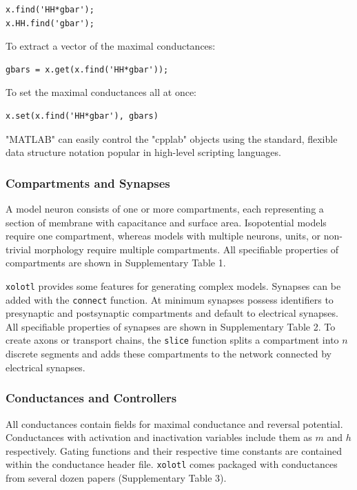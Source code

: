 \documentclass{frontiersSCNS} %
\begin{document}
\begin{lstlisting}[style=Matlab-editor]
x.find('HH*gbar');
x.HH.find('gbar');
\end{lstlisting}

To extract a vector of the maximal conductances:

\begin{lstlisting}[style=Matlab-editor]
gbars = x.get(x.find('HH*gbar'));
\end{lstlisting}

To set the maximal conductances all at once:

\begin{lstlisting}[style=Matlab-editor]
x.set(x.find('HH*gbar'), gbars)
\end{lstlisting}

"MATLAB" can easily control the "cpplab" objects using the standard, flexible data structure notation popular in high-level scripting languages.

\subsubsection{Compartments and Synapses}

A model neuron consists of one or more compartments, each representing a section of membrane with capacitance and surface area. Isopotential models require one compartment, whereas models with multiple neurons, units, or non-trivial morphology require multiple compartments. All specifiable properties of compartments are shown in Supplementary Table 1.

\texttt{xolotl} provides some features for generating complex models. Synapses can be added with the \texttt{connect} function. At minimum synapses possess identifiers to presynaptic and postsynaptic compartments and default to electrical synapses. All specifiable properties of synapses are shown in Supplementary Table 2. To create axons or transport chains, the \texttt{slice} function splits a compartment into $n$ discrete segments and adds these compartments to the network connected by electrical synapses.

\subsubsection{Conductances and Controllers}

All conductances contain fields for maximal conductance and reversal potential. Conductances with activation and inactivation variables include them as $m$ and $h$ respectively. Gating functions and their respective time constants are contained within the conductance header file. \texttt{xolotl} comes packaged with conductances from several dozen papers (Supplementary Table 3).
\end{document}
